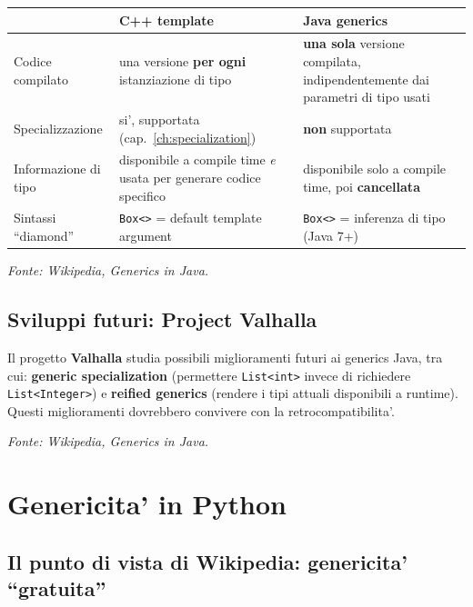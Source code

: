 \documentclass{report}
\newcommand{\code}[1]{\texttt{\small #1}}
\newcommand{\fontewiki}[1][Template (C++)]{{\footnotesize\itshape\color{gray} Fonte: Wikipedia, \emph{#1}.\par}}
\begin{document}
\begin{center}
\renewcommand{\arraystretch}{1.4}
\footnotesize
\begin{tabular}{|>{\raggedright\arraybackslash}p{4.2cm}|>{\raggedright\arraybackslash}p{4.2cm}|>{\raggedright\arraybackslash}p{4.2cm}|}
\hline
 & \textbf{C++ template} & \textbf{Java generics} \\
\hline
Codice compilato & una versione \textbf{per ogni} istanziazione di tipo & \textbf{una sola} versione compilata, indipendentemente dai parametri di tipo usati \\
\hline
Specializzazione & si', supportata (cap.~\ref{ch:specialization}) & \textbf{non} supportata \\
\hline
Informazione di tipo & disponibile a compile time \emph{e} usata per generare codice specifico & disponibile solo a compile time, poi \textbf{cancellata} \\
\hline
Sintassi ``diamond'' & \code{Box<>} = default template argument & \code{Box<>} = inferenza di tipo (Java 7+) \\
\hline
\end{tabular}
\end{center}

\fontewiki[Generics in Java]

\section{Sviluppi futuri: Project Valhalla}

Il progetto \textbf{Valhalla} studia possibili miglioramenti futuri ai
generics Java, tra cui: \textbf{generic specialization} (permettere
\code{List<int>} invece di richiedere \code{List<Integer>}) e
\textbf{reified generics} (rendere i tipi attuali disponibili a runtime).
Questi miglioramenti dovrebbero convivere con la retrocompatibilita'.

\fontewiki[Generics in Java]

\chapter{Genericita' in Python}\label{ch:python}

\section{Il punto di vista di Wikipedia: genericita' ``gratuita''}
\end{document}
